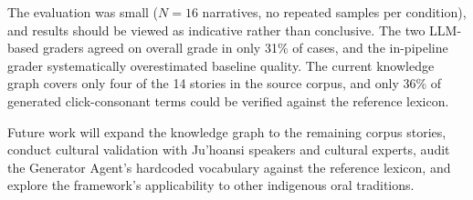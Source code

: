 \documentclass[pdflatex,sn-mathphys-num]{sn-jnl}%
\newcommand{\juhoansi}{\mbox{Ju\textbar{}'hoansi}}%
\theoremstyle{thmstyleone}%
\theoremstyle{thmstyletwo}%
\theoremstyle{thmstylethree}%
\begin{document}
The evaluation was small ($N=16$ narratives, no repeated samples per condition), and results should be viewed as indicative rather than conclusive. The two LLM-based graders agreed on overall grade in only 31\% of cases, and the in-pipeline grader systematically overestimated baseline quality. The current knowledge graph covers only four of the 14 stories in the source corpus, and only 36\% of generated click-consonant terms could be verified against the reference lexicon.

Future work will expand the knowledge graph to the remaining corpus stories, conduct cultural validation with \juhoansi{} speakers and cultural experts, audit the Generator Agent's hardcoded vocabulary against the reference lexicon, and explore the framework's applicability to other indigenous oral traditions.




\begingroup
\small
\medskip

\endgroup
\end{document}
